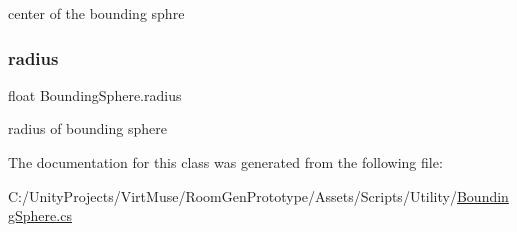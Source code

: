 center of the bounding sphre 

\mbox{\label{class_bounding_sphere_ad507cd54bc4021617024c2545fe9379c}} 
\subsubsection{\texorpdfstring{radius}{radius}}
{\footnotesize\ttfamily float Bounding\+Sphere.\+radius}



radius of bounding sphere 



The documentation for this class was generated from the following file\+:\begin{DoxyCompactItemize}
\item 
C\+:/\+Unity\+Projects/\+Virt\+Muse/\+Room\+Gen\+Prototype/\+Assets/\+Scripts/\+Utility/\mbox{\hyperlink{_bounding_sphere_8cs}{Bounding\+Sphere.\+cs}}\end{DoxyCompactItemize}
